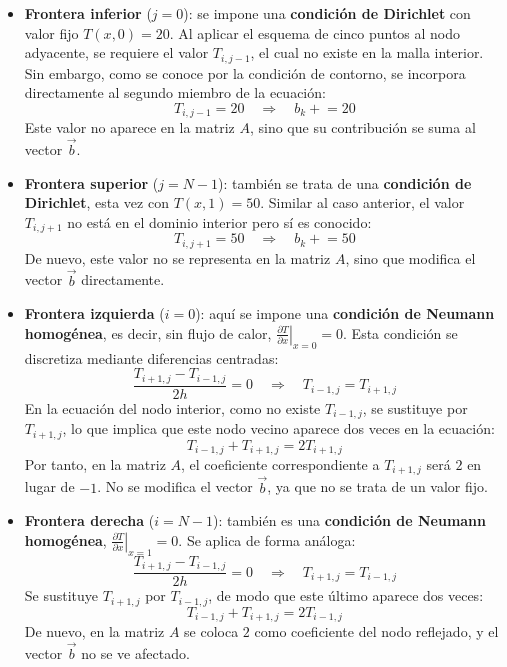 \documentclass{article}
\begin{document}
\begin{itemize}
\item \textbf{Frontera inferior} (\( j = 0 \)): se impone una \textbf{condición de Dirichlet} con valor fijo \( T(x,0) = 20 \). Al aplicar el esquema de cinco puntos al nodo adyacente, se requiere el valor \( T_{i,j-1} \), el cual no existe en la malla interior. Sin embargo, como se conoce por la condición de contorno, se incorpora directamente al segundo miembro de la ecuación:
$$
T_{i,j-1} = 20 \quad \Rightarrow \quad b_k \mathrel{+}= 20
$$
Este valor no aparece en la matriz \( A \), sino que su contribución se suma al vector \( \vec{b} \).

\item \textbf{Frontera superior} (\( j = N-1 \)): también se trata de una \textbf{condición de Dirichlet}, esta vez con \( T(x,1) = 50 \). Similar al caso anterior, el valor \( T_{i,j+1} \) no está en el dominio interior pero sí es conocido:
$$
T_{i,j+1} = 50 \quad \Rightarrow \quad b_k \mathrel{+}= 50
$$
De nuevo, este valor no se representa en la matriz \( A \), sino que modifica el vector \( \vec{b} \) directamente.

\item \textbf{Frontera izquierda} (\( i = 0 \)): aquí se impone una \textbf{condición de Neumann homogénea}, es decir, sin flujo de calor, \( \left. \frac{\partial T}{\partial x} \right|_{x=0} = 0 \). Esta condición se discretiza mediante diferencias centradas:
$$
\frac{T_{i+1,j} - T_{i-1,j}}{2h} = 0 \quad \Rightarrow \quad T_{i-1,j} = T_{i+1,j}
$$
En la ecuación del nodo interior, como no existe \( T_{i-1,j} \), se sustituye por \( T_{i+1,j} \), lo que implica que este nodo vecino aparece dos veces en la ecuación:
$$
T_{i-1,j} + T_{i+1,j} = 2T_{i+1,j}
$$
Por tanto, en la matriz \( A \), el coeficiente correspondiente a \( T_{i+1,j} \) será \(2\) en lugar de \(-1\). No se modifica el vector \( \vec{b} \), ya que no se trata de un valor fijo.

\item \textbf{Frontera derecha} (\( i = N-1 \)): también es una \textbf{condición de Neumann homogénea}, \( \left. \frac{\partial T}{\partial x} \right|_{x=1} = 0 \). Se aplica de forma análoga:
$$
\frac{T_{i+1,j} - T_{i-1,j}}{2h} = 0 \quad \Rightarrow \quad T_{i+1,j} = T_{i-1,j}
$$
Se sustituye \( T_{i+1,j} \) por \( T_{i-1,j} \), de modo que este último aparece dos veces:
$$
T_{i-1,j} + T_{i+1,j} = 2T_{i-1,j}
$$
De nuevo, en la matriz \( A \) se coloca \(2\) como coeficiente del nodo reflejado, y el vector \( \vec{b} \) no se ve afectado.
\end{itemize}
\end{document}
